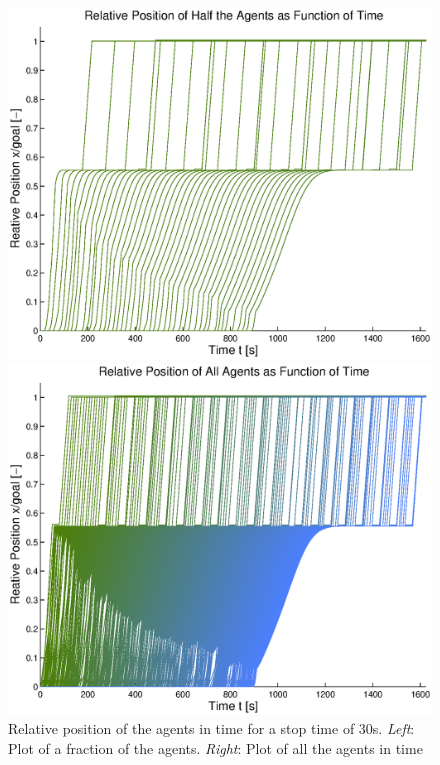 \documentclass[11pt]{article}
\begin{document}
\begin{figure}
 	\begin{minipage}{0.48\textwidth}
		\includegraphics[width = \textwidth]{Images/RESULTS02_Stop30/PositionFracAgents.eps}
 	 \end{minipage}
  	\hfill
  	\begin{minipage}{0.48\textwidth}
   		 \includegraphics[width = \textwidth]{Images/RESULTS02_Stop30/PositionAllAgents.eps}
  	\end{minipage}
  	\caption{Relative position of the agents in time for a stop time of 30s. \emph{Left}: Plot of a fraction of the agents. \emph{Right}: Plot of all the agents in time}
  	\label{img:stopTime30Agents}
\end{figure}
\end{document}

